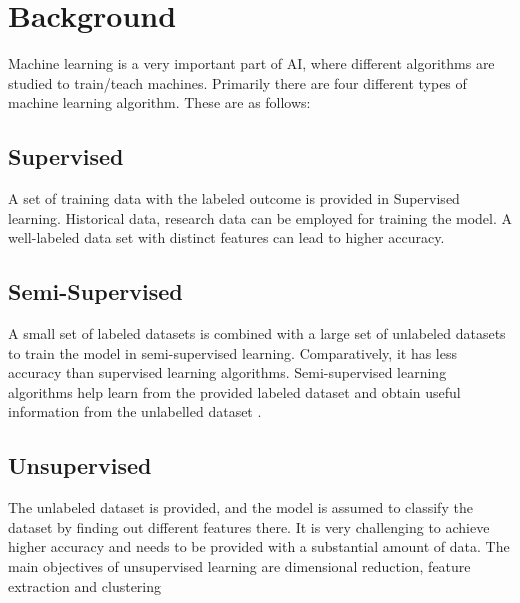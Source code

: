 \documentclass[conference]{IEEEtran}
\begin{document}
\section{Background}
Machine learning is a very important part of AI, where different algorithms are studied to train/teach machines. Primarily there are four different types of machine learning algorithm. These are as follows:

\subsection{Supervised}
A set of training data with the labeled outcome is provided in Supervised learning. Historical data, research data can be employed for training the model. A well-labeled data set with distinct features can lead to higher accuracy.

\subsection{Semi-Supervised}
A small set of labeled datasets is combined with a large set of unlabeled datasets to train the model in semi-supervised learning. Comparatively, it has less accuracy than supervised learning algorithms. Semi-supervised learning algorithms help learn from the provided labeled dataset and obtain useful information from the unlabelled dataset \cite{b1}.

\subsection{Unsupervised}
The unlabeled dataset is provided, and the model is assumed to classify the dataset by finding out different features there. It is very challenging to achieve higher accuracy and needs to be provided with a substantial amount of data. The main objectives of unsupervised learning are dimensional reduction, feature extraction and clustering \cite{b2}
\end{document}
